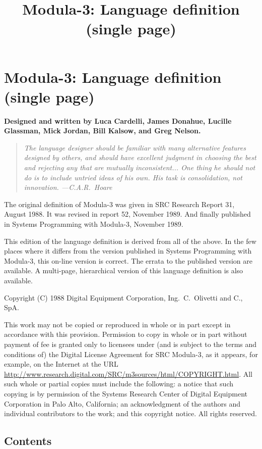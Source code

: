 \documentclass[10pt]{article}
\title{Modula-3: Language definition (single page)}
\begin{document}
\section*{Modula-3: Language definition (single page)}

\textbf{Designed and written by Luca Cardelli, James Donahue, Lucille
  Glassman, Mick Jordan, Bill Kalsow, and Greg Nelson.}

\begin{quote}
  \emph{The language designer should be familiar with many alternative
    features designed by others, and should have excellent judgment in
    choosing the best and rejecting any that are mutually inconsistent... One
    thing he should not do is to include untried ideas of his own.  His task is
    consolidation, not innovation.  ---C.A.R.\ Hoare}
\end{quote}

The original definition of Modula-3 was given in SRC Research Report 31,
August 1988.  It was revised in report 52, November 1989.  And finally
published in Systems Programming with Modula-3, November 1989.

This edition of the language definition is derived from all of the above.  In
the few places where it differs from the version published in Systems
Programming with Modula-3, this on-line version is correct.  The errata to the
published version are available.  A multi-page, hierarchical version of this
language definition is also available.

Copyright (C) 1988 Digital Equipment Corporation, Ing.\ C.\ Olivetti and C.,
SpA.

This work may not be copied or reproduced in whole or in part except in
accordance with this provision.  Permission to copy in whole or in part
without payment of fee is granted only to licensees under (and is subject to
the terms and conditions of) the Digital License Agreement for SRC Modula-3,
as it appears, for example, on the Internet at the URL
\url{http://www.research.digital.com/SRC/m3sources/html/COPYRIGHT.html}.  All
such whole or partial copies must include the following: a notice that such
copying is by permission of the Systems Research Center of Digital Equipment
Corporation in Palo Alto, California; an acknowledgment of the authors and
individual contributors to the work; and this copyright notice.  All rights
reserved.

\subsection*{Contents}
\end{document}

